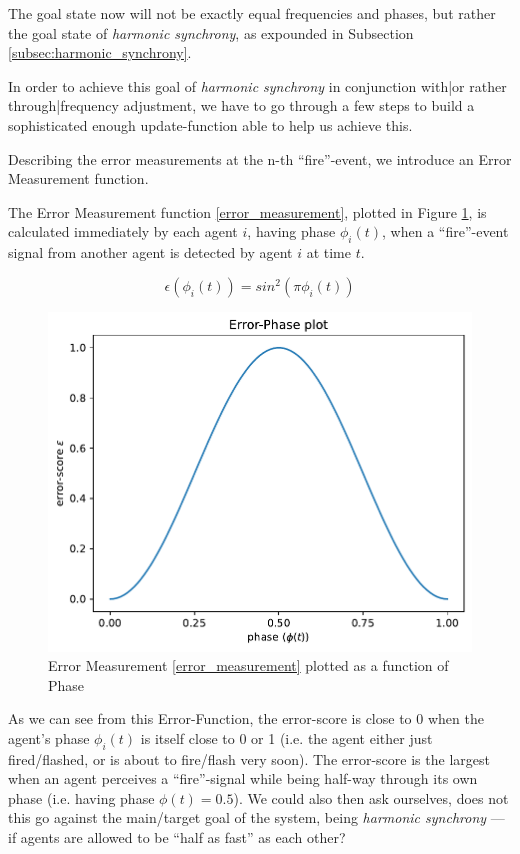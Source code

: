 			The goal state now will not be exactly equal frequencies and phases, but rather the goal state of \textit{harmonic synchrony}, as expounded in Subsection \ref{subsec:harmonic_synchrony}.
			
			In order to achieve this goal of \textit{harmonic synchrony} in conjunction with|or rather through|frequency adjustment, we have to go through a few steps to build a sophisticated enough update-function able to help us achieve this.
			
			
			
			Describing the error measurements at the n-th ``fire''-event, we introduce an Error Measurement function.
			
			The Error Measurement function \eqref{error_measurement}, plotted in Figure \ref{fig:error_measurement}, is calculated immediately by each agent $i$, having phase $\phi_i(t)$, when a ``fire''-event signal from another agent is detected by agent $i$ at time $t$.
			
			\begin{equation}
			\label{error_measurement}
				\epsilon(\phi_i(t)) = sin^2(\pi\phi_i(t))
			\end{equation} \nl
			
			\begin{figure}[h!]
				\centering
				\includegraphics[width=0.8\linewidth]{Assets/Figures/PhaseErrorFunction.pdf}
				\caption{Error Measurement \eqref{error_measurement} plotted as a function of Phase}
				\label{fig:error_measurement}
			\end{figure}
			
			As we can see from this Error-Function, the error-score is close to 0 when the agent's phase $\phi_i(t)$ is itself close to 0 or 1 (i.e. the agent either just fired/flashed, or is about to fire/flash very soon). The error-score is the largest when an agent perceives a ``fire''-signal while being half-way through its own phase (i.e. having phase $\phi(t)=0.5$). We could also then ask ourselves, does not this go against the main/target goal of the system, being \textit{harmonic synchrony} — if agents are allowed to be ``half as fast'' as each other? 
			

